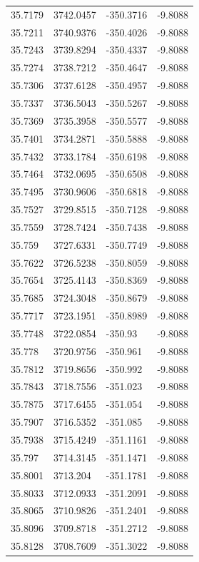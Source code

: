 \begin{table}[H]
\begin{tabular}{llll}
35.7179 & 3742.0457 & -350.3716 & -9.8088 \\
35.7211 & 3740.9376 & -350.4026 & -9.8088 \\
35.7243 & 3739.8294 & -350.4337 & -9.8088 \\
35.7274 & 3738.7212 & -350.4647 & -9.8088 \\
35.7306 & 3737.6128 & -350.4957 & -9.8088 \\
35.7337 & 3736.5043 & -350.5267 & -9.8088 \\
35.7369 & 3735.3958 & -350.5577 & -9.8088 \\
35.7401 & 3734.2871 & -350.5888 & -9.8088 \\
35.7432 & 3733.1784 & -350.6198 & -9.8088 \\
35.7464 & 3732.0695 & -350.6508 & -9.8088 \\
35.7495 & 3730.9606 & -350.6818 & -9.8088 \\
35.7527 & 3729.8515 & -350.7128 & -9.8088 \\
35.7559 & 3728.7424 & -350.7438 & -9.8088 \\
35.759 & 3727.6331 & -350.7749 & -9.8088 \\
35.7622 & 3726.5238 & -350.8059 & -9.8088 \\
35.7654 & 3725.4143 & -350.8369 & -9.8088 \\
35.7685 & 3724.3048 & -350.8679 & -9.8088 \\
35.7717 & 3723.1951 & -350.8989 & -9.8088 \\
35.7748 & 3722.0854 & -350.93 & -9.8088 \\
35.778 & 3720.9756 & -350.961 & -9.8088 \\
35.7812 & 3719.8656 & -350.992 & -9.8088 \\
35.7843 & 3718.7556 & -351.023 & -9.8088 \\
35.7875 & 3717.6455 & -351.054 & -9.8088 \\
35.7907 & 3716.5352 & -351.085 & -9.8088 \\
35.7938 & 3715.4249 & -351.1161 & -9.8088 \\
35.797 & 3714.3145 & -351.1471 & -9.8088 \\
35.8001 & 3713.204 & -351.1781 & -9.8088 \\
35.8033 & 3712.0933 & -351.2091 & -9.8088 \\
35.8065 & 3710.9826 & -351.2401 & -9.8088 \\
35.8096 & 3709.8718 & -351.2712 & -9.8088 \\
35.8128 & 3708.7609 & -351.3022 & -9.8088 \\

\end{tabular}
\end{table}
